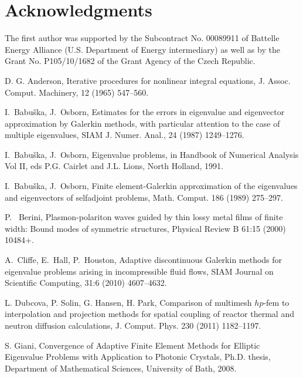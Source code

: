 \documentclass[smallextended]{svjour3}
\begin{document}
\section*{Acknowledgments}
The first author was supported by the Subcontract No. 00089911 of Battelle Energy
Alliance (U.S. Department of Energy intermediary) as well as by the Grant No. 
P105/10/1682 of the Grant Agency of the Czech Republic.

 
 
\begin{thebibliography}{10} 
{\sc D. G. Anderson,} 
 { Iterative procedures for nonlinear integral equations,} 
{J. Assoc. Comput.
Machinery,} 12 (1965) 547--560.

{\sc I.~Babu\v{s}ka, J.~Osborn,} 
 { Estimates for the errors in eigenvalue and eigenvector
  approximation by Galerkin methods, with particular attention to the
  case of multiple eigenvalues}, 
{ SIAM J. Numer. Anal.}, 24 (1987) 1249--1276.

{\sc I.~Babu\v{s}ka, J.~Osborn,} 
 { Eigenvalue problems},
 in Handbook of Numerical Analysis Vol II, eds P.G. Cairlet and J.L. Lions, North Holland, 1991.

{\sc I.~Babu\v{s}ka, J.~Osborn,} 
 { Finite element-Galerkin approximation of the
  eigenvalues and eigenvectors of selfadjoint problems}, 
{ Math. Comput.} 186 (1989) 275--297.

{\sc P.~ Berini,}
	{ Plasmon-polariton waves guided by thin lossy metal films of finite width: 
	Bound modes of symmetric structures},
	{ Physical Review B} 61:15 (2000) 10484+.

{\sc A.~Cliffe, E.~Hall, P.~Houston,}
	{ Adaptive discontinuous Galerkin methods for eigenvalue problems arising in 
	incompressible fluid flows},
	{ {SIAM} Journal on Scientific Computing}, 31:6 (2010)  4607--4632.

{\sc L. Dubcova, P. Solin, G. Hansen, H. Park,}
{ Comparison of multimesh $hp$-fem 
to interpolation and projection methods for spatial coupling of reactor 
thermal and neutron diffusion calculations}, 
{J. Comput. Phys.} 230 (2011)  1182--1197.

{\sc S. Giani,}
{ Convergence of Adaptive Finite Element Methods for Elliptic
Eigenvalue Problems with Application to
Photonic Crystals},
{Ph.D. thesis, Department of Mathematical Sciences, University of Bath, 2008}.


\end{thebibliography}
\end{document}
